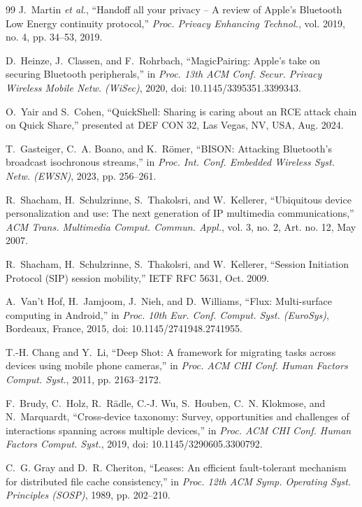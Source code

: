 \documentclass[conference]{IEEEtran}
\begin{document}
\begin{thebibliography}{99}
J.~Martin \emph{et al.}, ``Handoff all your privacy -- A review of Apple's Bluetooth Low Energy continuity protocol,'' \emph{Proc. Privacy Enhancing Technol.}, vol. 2019, no. 4, pp. 34--53, 2019.

D.~Heinze, J.~Classen, and F.~Rohrbach, ``MagicPairing: Apple's take on securing Bluetooth peripherals,'' in \emph{Proc. 13th ACM Conf. Secur. Privacy Wireless Mobile Netw. (WiSec)}, 2020, doi: 10.1145/3395351.3399343.

O.~Yair and S.~Cohen, ``QuickShell: Sharing is caring about an RCE attack chain on Quick Share,'' presented at DEF CON 32, Las Vegas, NV, USA, Aug. 2024.

T.~Gasteiger, C.~A. Boano, and K.~R{\"o}mer, ``BISON: Attacking Bluetooth's broadcast isochronous streams,'' in \emph{Proc. Int. Conf. Embedded Wireless Syst. Netw. (EWSN)}, 2023, pp. 256--261.

R.~Shacham, H.~Schulzrinne, S.~Thakolsri, and W.~Kellerer, ``Ubiquitous device personalization and use: The next generation of IP multimedia communications,'' \emph{ACM Trans. Multimedia Comput. Commun. Appl.}, vol. 3, no. 2, Art. no. 12, May 2007.

R.~Shacham, H.~Schulzrinne, S.~Thakolsri, and W.~Kellerer, ``Session Initiation Protocol (SIP) session mobility,'' IETF RFC 5631, Oct. 2009.

A.~Van't Hof, H.~Jamjoom, J.~Nieh, and D.~Williams, ``Flux: Multi-surface computing in Android,'' in \emph{Proc. 10th Eur. Conf. Comput. Syst. (EuroSys)}, Bordeaux, France, 2015, doi: 10.1145/2741948.2741955.

T.-H. Chang and Y.~Li, ``Deep Shot: A framework for migrating tasks across devices using mobile phone cameras,'' in \emph{Proc. ACM CHI Conf. Human Factors Comput. Syst.}, 2011, pp. 2163--2172.

F.~Brudy, C.~Holz, R.~R{\"a}dle, C.-J. Wu, S.~Houben, C.~N. Klokmose, and N.~Marquardt, ``Cross-device taxonomy: Survey, opportunities and challenges of interactions spanning across multiple devices,'' in \emph{Proc. ACM CHI Conf. Human Factors Comput. Syst.}, 2019, doi: 10.1145/3290605.3300792.

C.~G. Gray and D.~R. Cheriton, ``Leases: An efficient fault-tolerant mechanism for distributed file cache consistency,'' in \emph{Proc. 12th ACM Symp. Operating Syst. Principles (SOSP)}, 1989, pp. 202--210.


\end{thebibliography}
\end{document}
